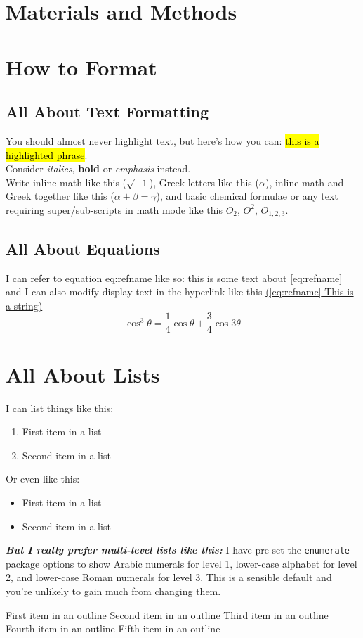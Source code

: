 \documentclass{getwriting}
\begin{document}
\section{Materials and Methods}
\section{How to Format}
\subsection{All About Text Formatting}
You should almost never highlight text, but here's how you can: \hl{this is a highlighted phrase}.\\
Consider \textit{italics}, \textbf{bold} or \emph{emphasis} instead.\\
Write inline math like this ($\sqrt{-1}$), Greek letters like this ($\alpha$), inline math and Greek together like this ($\alpha + \beta = \gamma$), and basic chemical formulae or any text requiring super/sub-scripts in math mode like this $O_2$, $O^2$, $O_{1,2,3}$. 
\subsection{All About Equations}
I can refer to equation eq:refname like so: this is some text about \hyperref[eq:refname]{\autoref{eq:refname}} and I can also modify display text in the hyperlink like this \hyperref[eq:refname]{(\autoref{eq:refname} This is a string)}
\begin{equation}
	\cos^3 \theta =\frac{1}{4}\cos\theta+\frac{3}{4}\cos 3\theta
	\label{eq:refname}
\end{equation}
\section{All About Lists}
I can list things like this:
\begin{enumerate}
	\item First item in a list
	\item Second item in a list
\end{enumerate}
Or even like this:
\begin{itemize}
	\item{First item in a list}
	\item{Second item in a list}
\end{itemize}
\textit{\textbf{But I really prefer \textbf{multi-level lists} like this:}}
I have pre-set the \lstinline{enumerate} package options to show Arabic numerals for level 1, lower-case alphabet for level 2, and lower-case Roman numerals for level 3. This is a sensible default and you're unlikely to gain much from changing them.
\begin{outline}[enumerate]
	\1 First item in an outline
	\2 Second item in an outline
	\3 Third item in an outline
	\1 Fourth item in an outline
	\2 Fifth item in an outline
\end{outline}
\end{document}
